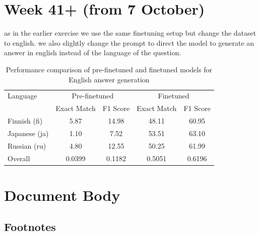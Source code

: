 \documentclass[11pt]{article}
\begin{document}
\section{Week 41+ (from 7 October)}

as in the earlier exercise we use the same finetuning setup but change the dataset to english.
we also slightly change the prompt to direct the model to generate an answer in english instead of the language of the question.


\begin{table}[ht]
    \centering
    \begin{tabular}{|l|c|c|c|c|}
        \hline
        Language & \multicolumn{2}{c|}{Pre-finetuned} & \multicolumn{2}{c|}{Finetuned} \\
        \cline{2-5}
        & Exact Match & F1 Score & Exact Match & F1 Score \\
        \hline
        Finnish (fi) & 5.87 & 14.98 & 48.11 & 60.95 \\
        Japanese (ja) & 1.10 & 7.52 & 53.51 & 63.10 \\
        Russian (ru) & 4.80 & 12.55 & 50.25 & 61.99 \\
        \hline
        Overall & 0.0399 & 0.1182 & 0.5051 & 0.6196 \\
        \hline
    \end{tabular}
    \caption{Performance comparison of pre-finetuned and finetuned models for English answer generation}
    \label{tab:week41_performance_comparison}
\end{table}



\section{Document Body}

\subsection{Footnotes}
\end{document}
